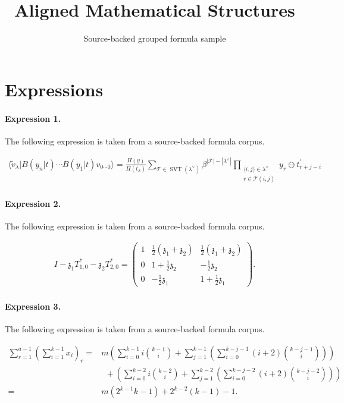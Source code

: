 \documentclass[11pt]{article}
\title{Aligned Mathematical Structures}
\author{Source-backed grouped formula sample}
\date{}
\begin{document}
\maketitle
\section{Expressions}
\paragraph{Expression 1.} The following expression is taken from a source-backed formula corpus.

\begin{align*}\langle\tilde v_\lambda |B(y_{n}|t)\cdots B(y_{1}|t)v_{0\cdots 0}\rangle =\frac{\Pi (y)}{\Pi(t_{\lambda })}\sum_{\mathcal{T}\in \operatorname{SVT}(\lambda ^{\vee })}\beta ^{|\mathcal{T}|-|\lambda ^{\vee }|}\prod_{\substack{ \langle i,j\rangle \in\lambda ^{\vee } \\ r\in \mathcal{T}(i,j)}}y_{r}\ominus t_{r+j-i}^{\prime }\end{align*}

\paragraph{Expression 2.} The following expression is taken from a source-backed formula corpus.

\begin{align*}I - \mathfrak{z}_1 T_{1,0}^* - \mathfrak{z}_2 T_{2,0}^* = \begin{pmatrix} 1 & \frac{1}{2}(\mathfrak{z}_1 + \mathfrak{z}_2) & \frac{1}{2}(\mathfrak{z}_1 + \mathfrak{z}_2) \\ 0 & 1 + \frac{1}{2} \mathfrak{z}_2 & -\frac{1}{2} \mathfrak{z}_2 \\ 0 & - \frac{1}{2} \mathfrak{z}_1 & 1 + \frac{1}{2} \mathfrak{z}_1 \end{pmatrix}.\end{align*}

\paragraph{Expression 3.} The following expression is taken from a source-backed formula corpus.

\begin{align*}\sum_{r=1}^{a-1}\left(\sum_{i=1}^{k-1} x_i\right)_r=&m\left(\sum_{i=0}^{k-1}i\binom{k-1}{i}+\sum_{j=1}^{k-1}\left(\sum_{i=0}^{k-j-1}(i+2)\binom{k-j-1}{i}\right)\right)\\&\ \ +\left(\sum_{i=0}^{k-2}i\binom{k-2}{i}+\sum_{j=1}^{k-2}\left(\sum_{i=0}^{k-j-2}(i+2)\binom{k-j-2}{i}\right)\right)\\=&m(2^{k-1}k-1)+2^{k-2}(k-1)-1.\end{align*}
\end{document}

